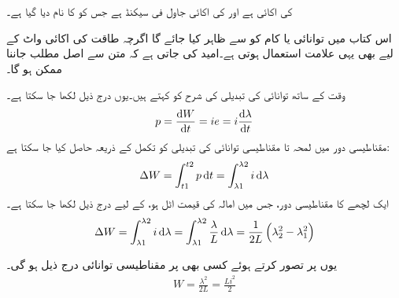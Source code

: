   کی اکائی   ہے اور   کی اکائی جاول فی سیکنڈ ہے جس کو   کا نام دیا گیا  ہے۔

اس کتاب میں توانائی یا کام کو  سے ظاہر کیا جائے گا اگرچہ طاقت کی اکائی واٹ  کے لیے بھی یہی علامت استعمال ہوتی ہے۔امید کی جاتی ہے کہ متن سے  اصل مطلب جاننا ممکن ہو گا۔

وقت  کے ساتھ توانائی  کی تبدیلی کی شرح کو   کہتے ہیں۔یوں درج ذیل لکھا جا سکتا ہے۔
\begin{align}
p=\frac{\dif W}{\dif t} = ie = i \frac{\dif \lambda}{\dif t}
\end{align} 
مقناطیسی دور میں  لمحہ  تا   مقناطیسی توانائی کی تبدیلی کو تکمل کے ذریعہ حاصل کیا جا سکتا ہے:
\begin{align}
\Delta W = \int_{t1}^{t2} p \dif t =\int_{\lambda1}^{\lambda2} i \dif \lambda
\end{align}
ایک لچھے کا مقناطیسی دور، جس میں  امالہ کی قیمت اٹل ہو، کے لیے درج ذیل لکھا جا سکتا ہے۔
\begin{align}
\Delta W = \int_{\lambda1}^{\lambda2} i \dif \lambda=\int_{\lambda1}^{\lambda2} \frac{\lambda}{L} \dif \lambda=\frac{1}{2 L} \left(\lambda_2^2-\lambda_1^2 \right)
\end{align}

یوں  پر  تصور کرتے ہوئے  کسی بھی  پر مقناطیسی توانائی درج ذیل ہو گی۔
\begin{align}
 W=\frac{\lambda^2}{2L}=\frac{L i^2}{2}
\end{align}

